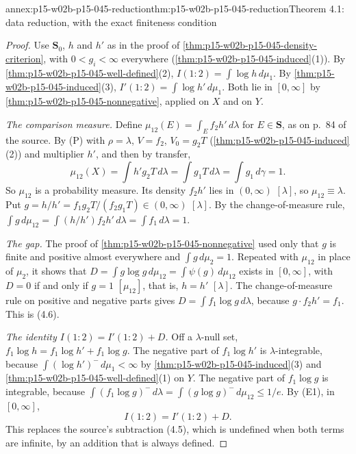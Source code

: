 \begin{annexitem}{annex:p15-w02b-p15-045-reduction}{thm:p15-w02b-p15-045-reduction}{Theorem 4.1: data reduction, with the exact finiteness condition}
\begin{proof}
Use \(\mathbf S_0\), \(h\) and \(h'\) as in the proof of
\cref{thm:p15-w02b-p15-045-density-criterion}, with \(0<g_i<\infty\)
everywhere (\cref{thm:p15-w02b-p15-045-induced}(1)). By
\cref{thm:p15-w02b-p15-045-well-defined}(2),
\(I(1:2)=\int\log h\,d\mu_1\). By
\cref{thm:p15-w02b-p15-045-induced}(3),
\(I'(1:2)=\int\log h'\,d\mu_1\). Both lie in \([0,\infty]\) by
\cref{thm:p15-w02b-p15-045-nonnegative}, applied on \(X\) and on \(Y\).

\emph{The comparison measure.} Define
\(\mu_{12}(E)=\int_Ef_2h'\,d\lambda\) for \(E\in\mathbf S\), as on p.~84
of the source. By (P) with \(\rho=\lambda\), \(V=f_2\), \(V_0=g_2T\)
(\cref{thm:p15-w02b-p15-045-induced}(2)) and multiplier \(h'\), and then
by transfer,
\[
  \mu_{12}(X)=\int h'g_2T\,d\lambda=\int g_1T\,d\lambda=\int g_1\,d\gamma=1 .
\]
So \(\mu_{12}\) is a probability measure. Its density \(f_2h'\) lies in
\((0,\infty)\) \([\lambda]\), so \(\mu_{12}\equiv\lambda\). Put
\(g=h/h'=f_1g_2T/(f_2g_1T)\in(0,\infty)\) \([\lambda]\). By the
change-of-measure rule,
\(\int g\,d\mu_{12}=\int(h/h')f_2h'\,d\lambda=\int f_1\,d\lambda=1\).

\emph{The gap.} The proof of \cref{thm:p15-w02b-p15-045-nonnegative}
used only that \(g\) is finite and positive almost everywhere and
\(\int g\,d\mu_2=1\). Repeated with \(\mu_{12}\) in place of \(\mu_2\),
it shows that
\(D=\int g\log g\,d\mu_{12}=\int\psi(g)\,d\mu_{12}\) exists in
\([0,\infty]\), with \(D=0\) if and only if \(g=1\) \([\mu_{12}]\), that
is, \(h=h'\) \([\lambda]\). The change-of-measure rule on positive and
negative parts gives \(D=\int f_1\log g\,d\lambda\), because
\(g\cdot f_2h'=f_1\). This is (4.6).

\emph{The identity \(I(1:2)=I'(1:2)+D\).} Off a \(\lambda\)-null set,
\(f_1\log h=f_1\log h'+f_1\log g\). The negative part of \(f_1\log h'\)
is \(\lambda\)-integrable, because \(\int(\log h')^-\,d\mu_1<\infty\) by
\cref{thm:p15-w02b-p15-045-induced}(3) and
\cref{thm:p15-w02b-p15-045-well-defined}(1) on \(Y\). The negative part
of \(f_1\log g\) is integrable, because
\(\int(f_1\log g)^-\,d\lambda=\int(g\log g)^-\,d\mu_{12}\leq1/e\). By
(E1), in \([0,\infty]\),
\[
  I(1:2)=I'(1:2)+D .
\]
This replaces the source's subtraction (4.5), which is undefined when
both terms are infinite, by an addition that is always defined.


\end{proof}
\end{annexitem}
